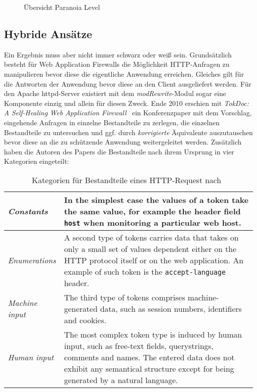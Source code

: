 \begin{figure}[h]
  \centering
  
  \caption{Übersicht Paranoia Level~\cite{owaspcrs}}
  \label{fig.paranoia}
\end{figure}




\subsection{Hybride Ansätze} %
Ein Ergebnis muss aber nicht immer schwarz oder weiß sein.  Grundsätzlich besteht für Web Application Firewalls die Möglichkeit HTTP-Anfragen zu manipulieren bevor diese die eigentliche Anwendung erreichen. Gleiches gilt für die Antworten der Anwendung bevor diese an den Client ausgeliefert werden. Für den Apache httpd-Server existiert mit dem \emph{modRewrite}-Modul sogar eine Komponente einzig und allein für diesen Zweck. Ende 2010 erschien mit \glqq\emph{TokDoc: A Self-Healing Web Application Firewall}\grqq~\cite{Krueger2010} ein Konferenzpaper mit dem Vorschlag, eingehende Anfragen in einzelne Bestandteile zu zerlegen, die einzelnen Bestandteile zu untersuchen und ggf. durch \emph{korrigierte} Äquivalente auszutauschen bevor diese an die zu schützende Anwendung weitergeleitet werden. Zusätzlich haben die Autoren des Papers die Bestandteile nach ihrem Ursprung in vier Kategorien eingeteilt:\\

\begin{table}[h]
  \centering
  \begin{tabular}{|l|p{8cm}|}
    \hline
    \emph{Constants} & In the simplest case the values of a token take the same value, for example the header field \verb=host= when monitoring a particular web host. \\
    \hline
    \emph{Enumerations} &  A second type of tokens carries data that takes on only a small set of values dependent either on the HTTP protocol itself or on the web application. An example of such token is the \verb=accept-language= header.\\
    \hline
    \emph{Machine input} & The third type of tokens comprises machine-generated data, such as session numbers, identifiers and cookies. \\
    \hline
    \emph{Human input} & The most complex token type is induced by human input, such as free-text fields, querystrings, comments and names. The entered data does not exhibit any semantical structure except for being generated by a natural language.  \\
    \hline
  \end{tabular}
  \caption{Kategorien für Bestandteile eines HTTP-Request nach~\cite{Krueger2010}}
  \label{tab:tocdoc}
\end{table}

